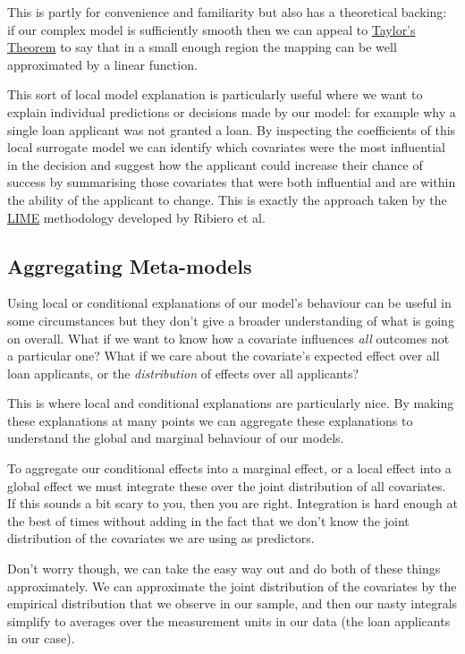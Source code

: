 \documentclass[
  letterpaper,
  DIV=11,
  numbers=noendperiod]{scrreprt}
\begin{document}
This is partly for convenience and familiarity but also has a
theoretical backing: if our complex model is sufficiently smooth then we
can appeal to
\href{https://en.wikipedia.org/wiki/Taylor\%27s_theorem}{Taylor's
Theorem} to say that in a small enough region the mapping can be well
approximated by a linear function.

This sort of local model explanation is particularly useful where we
want to explain individual predictions or decisions made by our model:
for example why a single loan applicant was not granted a loan. By
inspecting the coefficients of this local surrogate model we can
identify which covariates were the most influential in the decision and
suggest how the applicant could increase their chance of success by
summarising those covariates that were both influential and are within
the ability of the applicant to change. This is exactly the approach
taken by the
\href{https://christophm.github.io/interpretable-ml-book/lime.html}{LIME}
methodology developed by Ribiero et al.~

\subsection{Aggregating Meta-models}\label{aggregating-meta-models}

Using local or conditional explanations of our model's behaviour can be
useful in some circumstances but they don't give a broader understanding
of what is going on overall. What if we want to know how a covariate
influences \emph{all} outcomes not a particular one? What if we care
about the covariate's expected effect over all loan applicants, or the
\emph{distribution} of effects over all applicants?

This is where local and conditional explanations are particularly nice.
By making these explanations at many points we can aggregate these
explanations to understand the global and marginal behaviour of our
models.

To aggregate our conditional effects into a marginal effect, or a local
effect into a global effect we must integrate these over the joint
distribution of all covariates. If this sounds a bit scary to you, then
you are right. Integration is hard enough at the best of times without
adding in the fact that we don't know the joint distribution of the
covariates we are using as predictors.

Don't worry though, we can take the easy way out and do both of these
things approximately. We can approximate the joint distribution of the
covariates by the empirical distribution that we observe in our sample,
and then our nasty integrals simplify to averages over the measurement
units in our data (the loan applicants in our case).
\end{document}
